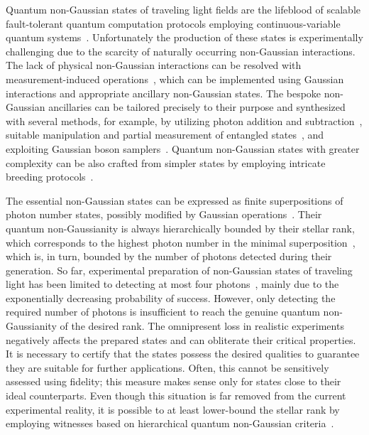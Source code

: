 \documentclass{article}
\begin{document}
Quantum non-Gaussian states of traveling light fields are the lifeblood of scalable fault-tolerant quantum computation protocols employing continuous-variable quantum systems~\cite{lloyd1999,gottesman2001,menicucci2014,baragiola2019,bourassa2021,madsen2022,aghaeerad2025}. Unfortunately the production of these states is experimentally challenging due to the scarcity of naturally occurring non-Gaussian interactions. The lack of physical non-Gaussian interactions can be resolved with measurement-induced operations~\cite{filip2005,marek2009,marek2011,yukawa2013b,miyata2016,marek2018a,sakaguchi2023}, which can be implemented using Gaussian interactions and appropriate ancillary non-Gaussian states. The bespoke non-Gaussian ancillaries can be tailored precisely to their purpose and synthesized with several methods, for example, by utilizing photon addition and subtraction~\cite{dakna1999,fiurasek2005,eaton2019,takase2021,endo2023}, suitable manipulation and partial measurement of entangled states~\cite{yukawa2013a,yoshikawa2018,tiedau2019,provaznik2020}, and exploiting Gaussian boson samplers~\cite{su2019,quesada2019}. Quantum non-Gaussian states with greater complexity can be also crafted from simpler states by employing intricate breeding protocols~\cite{weigand2018,eaton2022,zheng2023,takase2024,aghaeerad2025}.

The essential non-Gaussian states can be expressed as finite superpositions of photon number states, possibly modified by Gaussian operations~\cite{lachman2019,fiurasek2022,walschaers2021,chabaud2020}. Their quantum non-Gaussianity is always hierarchically bounded by their stellar rank, which corresponds to the highest photon number in the minimal superposition~\cite{walschaers2021,lachman2019,fiurasek2022}, which is, in turn, bounded by the number of photons detected during their generation. So far, experimental preparation of non-Gaussian states of traveling light has been limited to detecting at most four photons~\cite{engelkemeier2021,endo2025}, mainly due to the exponentially decreasing probability of success.
%
However, only detecting the required number of photons is insufficient to reach the genuine quantum non-Gaussianity of the desired rank. The omnipresent loss in realistic experiments negatively affects the prepared states and can obliterate their critical properties. It is necessary to certify that the states possess the desired qualities to guarantee they are suitable for further applications. Often, this cannot be sensitively assessed using fidelity; this measure makes sense only for states close to their ideal counterparts. Even though this situation is far removed from the current experimental reality, it is possible to at least lower-bound the stellar rank by employing witnesses based on hierarchical quantum non-Gaussian criteria~\cite{lachman2019,fiurasek2022}.
\end{document}
